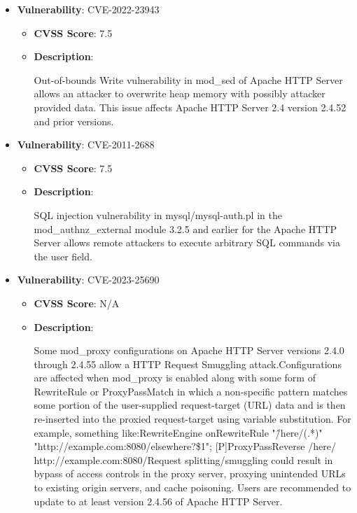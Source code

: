 \documentclass{article}
\begin{document}
\begin{itemize}
        \item \textbf{Vulnerability}: CVE-2022-23943
        \begin{itemize}
            \item \textbf{CVSS Score}:  7.5 
            \item \textbf{Description}:
            \parbox[t]{0.9\linewidth}{
                \ttfamily Out-of-bounds Write vulnerability in mod\_sed of Apache HTTP Server allows an attacker to overwrite heap memory with possibly attacker provided data. This issue affects Apache HTTP Server 2.4 version 2.4.52 and prior versions.
            }
        \end{itemize}
    
        \item \textbf{Vulnerability}: CVE-2011-2688
        \begin{itemize}
            \item \textbf{CVSS Score}:  7.5 
            \item \textbf{Description}:
            \parbox[t]{0.9\linewidth}{
                \ttfamily SQL injection vulnerability in mysql/mysql-auth.pl in the mod\_authnz\_external module 3.2.5 and earlier for the Apache HTTP Server allows remote attackers to execute arbitrary SQL commands via the user field.
            }
        \end{itemize}
    
        \item \textbf{Vulnerability}: CVE-2023-25690
        \begin{itemize}
            \item \textbf{CVSS Score}:  N/A 
            \item \textbf{Description}:
            \parbox[t]{0.9\linewidth}{
                \ttfamily Some mod\_proxy configurations on Apache HTTP Server versions 2.4.0 through 2.4.55 allow a HTTP Request Smuggling attack.Configurations are affected when mod\_proxy is enabled along with some form of RewriteRule or ProxyPassMatch in which a non-specific pattern matches some portion of the user-supplied request-target (URL) data and is then re-inserted into the proxied request-target using variable substitution. For example, something like:RewriteEngine onRewriteRule "\^/here/(.*)" "http://example.com:8080/elsewhere?\$1"; [P]ProxyPassReverse /here/ http://example.com:8080/Request splitting/smuggling could result in bypass of access controls in the proxy server, proxying unintended URLs to existing origin servers, and cache poisoning. Users are recommended to update to at least version 2.4.56 of Apache HTTP Server.
            }
        \end{itemize}
    

\end{itemize}
\end{document}
